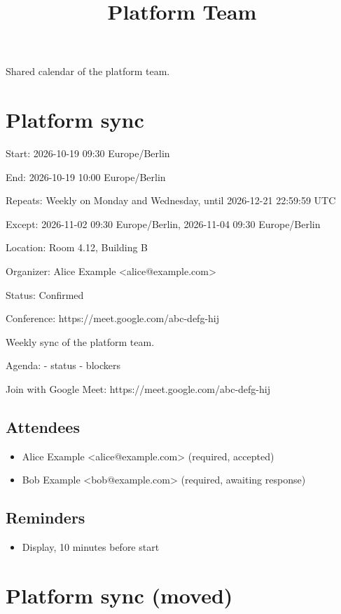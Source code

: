 \documentclass[11pt,a4paper]{article}
\title{Platform Team}
\begin{document}
\maketitle

Shared calendar of the platform team.

\section{Platform sync}

Start: 2026-10-19 09:30 Europe/Berlin

End: 2026-10-19 10:00 Europe/Berlin

Repeats: Weekly on Monday and Wednesday, until 2026-12-21 22:59:59 UTC

Except: 2026-11-02 09:30 Europe/Berlin, 2026-11-04 09:30 Europe/Berlin

Location: Room 4.12, Building B

Organizer: Alice Example <alice@example.com>

Status: Confirmed

Conference: https://meet.google.com/abc-defg-hij

Weekly sync of the platform team.

Agenda:
- status
- blockers

Join with Google Meet: https://meet.google.com/abc-defg-hij

\subsection{Attendees}

\begin{itemize}
\item Alice Example <alice@example.com> (required, accepted)
\item Bob Example <bob@example.com> (required, awaiting response)
\end{itemize}

\subsection{Reminders}

\begin{itemize}
\item Display, 10 minutes before start
\end{itemize}

\section{Platform sync (moved)}
\end{document}
